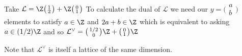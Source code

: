 \begin{example}
    Take $\mathcal{L}= \Z 
        \big(\begin{smallmatrix} 1\\2 \end{smallmatrix}\big) + 
        \Z \big(\begin{smallmatrix} 0\\ 1 \end{smallmatrix}\big)$
        To calculate the dual of $\mathcal{L}$ we need our $y = \big(\begin{smallmatrix}
          a\\b\end{smallmatrix}\big)$ elements to satisfy $a \in \Z$ and $2a + b \in \Z$ which is equivalent to asking $a \in (1/2)\Z$ and so $\mathcal{L}^{\vee} = \big(\begin{smallmatrix}
          1/2\\0
        \end{smallmatrix}\big)\Z + \big(\begin{smallmatrix}
          0\\1
        \end{smallmatrix}\big) \Z$
\end{example}

Note that $\mathcal{L}^{\vee}$ is itself a lattice of the same dimension.
\fi
